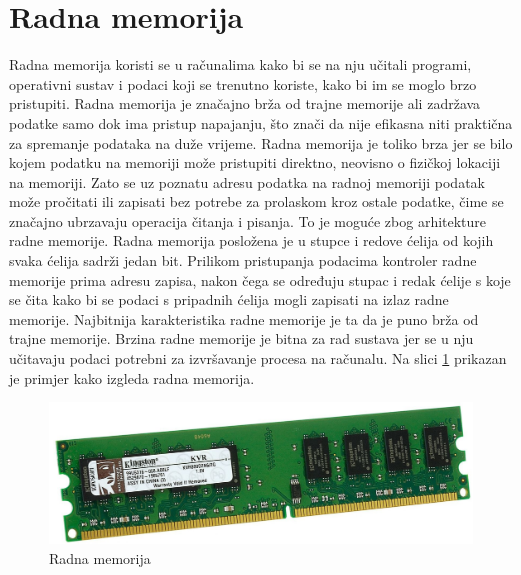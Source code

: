 \documentclass[times, utf8, zavrsni, square]{fer}
\begin{document}
\section{Radna memorija}
Radna memorija koristi se u računalima kako bi se na nju učitali programi, operativni sustav i podaci koji se trenutno koriste, kako bi im se moglo brzo pristupiti\cite{ramO}.
Radna memorija je značajno brža od trajne memorije ali zadržava podatke samo dok ima pristup napajanju, što znači da nije efikasna niti praktična za spremanje podataka na duže vrijeme\cite{ram2}.
Radna memorija je toliko brza jer se bilo kojem podatku na memoriji može pristupiti direktno, neovisno o fizičkoj lokaciji na memoriji.
Zato se uz poznatu adresu podatka na radnoj memoriji podatak može pročitati ili zapisati bez potrebe za prolaskom kroz ostale podatke, čime se značajno ubrzavaju operacija čitanja i pisanja.
To je moguće zbog arhitekture radne memorije. 
Radna memorija posložena je u stupce i redove ćelija od kojih svaka ćelija sadrži jedan bit.
Prilikom pristupanja podacima kontroler radne memorije prima adresu zapisa, nakon čega se određuju stupac i redak ćelije s koje se čita kako bi se podaci s pripadnih ćelija mogli zapisati na izlaz radne memorije.
Najbitnija karakteristika radne memorije je ta da je puno brža od trajne memorije. 
Brzina radne memorije je bitna za rad sustava jer se u nju učitavaju podaci potrebni za izvršavanje procesa na računalu.
Na slici \ref{fig:ram} prikazan je primjer kako izgleda radna memorija.
\begin{figure}[h]
    \centering
    \includegraphics[width=1\textwidth]{ram}
    \caption{Radna memorija}
    \label{fig:ram}
\end{figure}
\FloatBarrier
\end{document}
